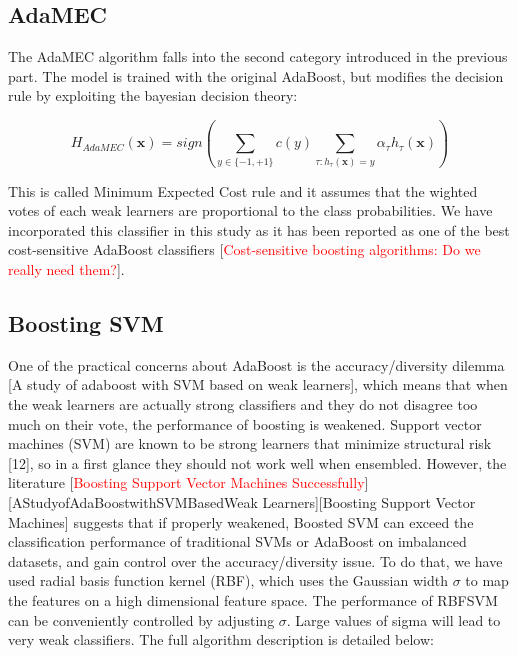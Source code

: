 \documentclass[conference]{IEEEtran}
\begin{document}
\subsection{AdaMEC}
The AdaMEC algorithm falls into the second category introduced in the previous part. The model is trained with the original AdaBoost, but modifies the decision rule by exploiting the bayesian decision theory:

$$ H_{AdaMEC}(\boldsymbol x) = sign \left( \sum_{y \in \{-1,+1\}} c(y) \sum_{\tau: h_{\tau}(\boldsymbol x)=y} \alpha_{\tau} h_{\tau}(\boldsymbol x)\right)$$

This is called Minimum Expected Cost rule and it assumes that the wighted votes of each weak learners are proportional to the class probabilities. We have incorporated this classifier in this study as it has been reported as one of the best cost-sensitive AdaBoost classifiers [\textcolor{red}{Cost-sensitive boosting algorithms: Do we really need them?}].


\subsection{Boosting SVM}
One of the practical concerns about AdaBoost is the accuracy/diversity dilemma [A study of adaboost with SVM based on weak learners], which means that when the weak learners are actually strong classifiers and they do not disagree too much on their vote, the performance of boosting is weakened. Support vector machines (SVM) are known to be strong learners that minimize structural risk [12], so in a first glance they should not work well when ensembled. However, the literature [\textcolor{red}{Boosting Support Vector Machines Successfully}][AStudyofAdaBoostwithSVMBasedWeak Learners][Boosting Support Vector Machines] suggests that if properly weakened, Boosted SVM can exceed the classification performance of traditional SVMs or AdaBoost on imbalanced datasets, and gain control over the accuracy/diversity issue. To do that, we have used radial basis function kernel (RBF), which uses the Gaussian width $\sigma$ to map the features on a high dimensional feature space. The performance of RBFSVM can be conveniently controlled by adjusting $\sigma$. Large values of sigma will lead to very weak classifiers. The full algorithm description is detailed below:
\end{document}
